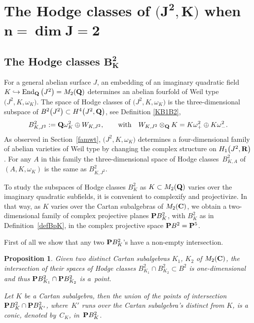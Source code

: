\documentclass[pdftex]{sigma}
\numberwithin{equation}{section}
\newtheorem{Proposition}[Theorem]{Proposition}
 { \theoremstyle{definition}
\newtheorem{Definition}[Theorem]{Definition}
\newtheorem{Note}[Theorem]{Note}
\newtheorem{Example}[Theorem]{Example}
\newtheorem{Remark}[Theorem]{Remark} }
\begin{document}
\section[The Hodge classes of (J\^{}2,K) when n=dim J=2]{The Hodge classes of $\boldsymbol{\big(J^2,K\big)}$ when $\boldsymbol{n=\dim J=2}$}\label{limHC}

\subsection[The Hodge classes B\_K\^{}2]{The Hodge classes $\boldsymbol{B_K^2}$}\label{cubic4}

For a general abelian surface $J$,
an embedding of an imaginary quadratic field $K\hookrightarrow \operatorname{End}_{\bf Q}\big(J^2\big)=M_2({\bf Q})$
determines an abelian fourfold of Weil type $\big(J^2,K,\omega_K\big)$.
The space of Hodge classes of $\big(J^2,K,\omega_K\big)$ is the three-dimensional
subspace of $B^2\big(J^2\big)\subset H^4\big(J^2,{\bf Q}\big)$, see Definition \ref{KB1B2},
\[
B^2_{K,J^2} := {\bf Q} \omega_K^2 \oplus W_{K,J^2},\qquad \text{with}\quad
W_{K,J^2}\otimes_{\bf Q} K = K\omega_+^2 \oplus K\omega_-^2.
\]
As observed in Section~\ref{famwt},
$\big(J^2,K,\omega_K\big)$ determines
a four-dimensional family of abelian varieties of Weil type by changing the complex structure
on $H_1\big(J^2,{\bf R}\big)$.
For any $A$ in this family the three-dimensional space of Hodge classes~$B^2_{K,A}$
of $(A,K,\omega_K)$ is the same as $B^2_{K,J^2}$.

To study the subspaces of Hodge classes $B^2_K$ as $K\subset M_2({\bf Q})$
varies over the imaginary quadratic subfields,
it is convenient to complexify and projectivize. In that way,
as $K$ varies over the Cartan subalgebras of $M_2({\bf C})$,
we obtain a two-dimensional family of complex projective planes ${\bf P} B^2_K$,
with $B^2_K$ as in Definition~\ref{defBpK},
in the complex projective space ${\bf P} B^2={\bf P}^5$.

First of all we show that any two ${\bf P} B^2_K$'s have a non-empty intersection.

\begin{Proposition} \label{conicCK}
Given two distinct Cartan subalgebras $K_1$, $K_2$
of $M_2({\bf C})$, the intersection of their spaces of Hodge classes $B^2_{K_1}\cap B^2_{K_2}
\subset B^2$ is one-dimensional and thus ${\bf P} B^2_{K_1}\cap {\bf P} B^2_{K_2}$ is a~point.

Let $K$ be a Cartan subalgebra,
then the union of the points of intersection ${\bf P} B^2_K\cap {\bf P} B^2_{K'}$,
where~$K'$ runs over the Cartan subalgebra's distinct from $K$, is a conic, denoted by~$C_K$,
in~${\bf P} B^2_K$.
\end{Proposition}
\end{document}
